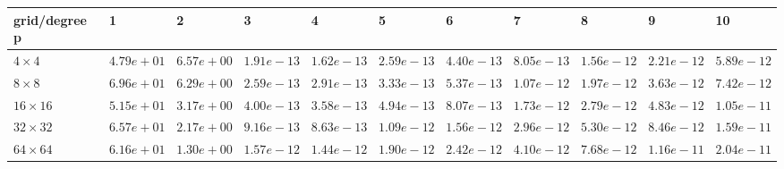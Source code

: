 \begin{tabular}{lllllllllll}
\hline
 grid/degree p   & 1          & 2          & 3          & 4          & 5          & 6          & 7          & 8          & 9          & 10         \\
\hline
 $4 \times 4$    & $4.79e+01$ & $6.57e+00$ & $1.91e-13$ & $1.62e-13$ & $2.59e-13$ & $4.40e-13$ & $8.05e-13$ & $1.56e-12$ & $2.21e-12$ & $5.89e-12$ \\
 $8 \times 8$    & $6.96e+01$ & $6.29e+00$ & $2.59e-13$ & $2.91e-13$ & $3.33e-13$ & $5.37e-13$ & $1.07e-12$ & $1.97e-12$ & $3.63e-12$ & $7.42e-12$ \\
 $16 \times 16$  & $5.15e+01$ & $3.17e+00$ & $4.00e-13$ & $3.58e-13$ & $4.94e-13$ & $8.07e-13$ & $1.73e-12$ & $2.79e-12$ & $4.83e-12$ & $1.05e-11$ \\
 $32 \times 32$  & $6.57e+01$ & $2.17e+00$ & $9.16e-13$ & $8.63e-13$ & $1.09e-12$ & $1.56e-12$ & $2.96e-12$ & $5.30e-12$ & $8.46e-12$ & $1.59e-11$ \\
 $64 \times 64$  & $6.16e+01$ & $1.30e+00$ & $1.57e-12$ & $1.44e-12$ & $1.90e-12$ & $2.42e-12$ & $4.10e-12$ & $7.68e-12$ & $1.16e-11$ & $2.04e-11$ \\
\hline
\end{tabular}